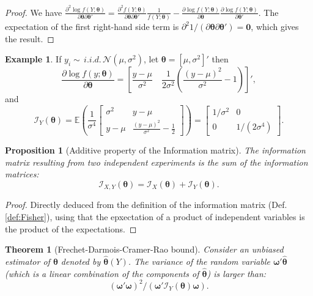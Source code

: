 \documentclass[
  12pt,
]{book}
\newtheorem{theorem}{Theorem}[chapter]
\newtheorem{proposition}{Proposition}[chapter]
\theoremstyle{definition}
\theoremstyle{definition}
\newtheorem{example}{Example}[chapter]
\theoremstyle{definition}
\theoremstyle{definition}
\theoremstyle{remark}
\begin{document}
\begin{proof}
We have \(\frac{\partial^2 \log f(Y;\boldsymbol\theta)}{\partial \boldsymbol\theta \partial \boldsymbol\theta'} = \frac{\partial^2 f(Y;\boldsymbol\theta)}{\partial \boldsymbol\theta \partial \boldsymbol\theta'}\frac{1}{f(Y;\boldsymbol\theta)} - \frac{\partial \log f(Y;\boldsymbol\theta)}{\partial \boldsymbol\theta}\frac{\partial \log f(Y;\boldsymbol\theta)}{\partial \boldsymbol\theta'}\). The expectation of the first right-hand side term is \(\partial^2 1 /(\partial \boldsymbol\theta \partial \boldsymbol\theta') = \mathbf{0}\), which gives the result.
\end{proof}

\begin{example}
If \(y_i \sim\,i.i.d.\, \mathcal{N}(\mu,\sigma^2)\), let \(\boldsymbol\theta = [\mu,\sigma^2]'\) then
\[
\frac{\partial \log f(y;\boldsymbol\theta)}{\partial \boldsymbol\theta} = \left[\frac{y-\mu}{\sigma^2} \quad \frac{1}{2\sigma^2}\left(\frac{(y-\mu)^2}{\sigma^2}-1\right) \right]',
\]
and
\[
\mathcal{I}_Y(\boldsymbol\theta) = \mathbb{E}\left( \frac{1}{\sigma^4}
\left[
\begin{array}{cc}
\sigma^2&y-\mu\\
y-\mu & \frac{(y-\mu)^2}{\sigma^2}-\frac{1}{2}
\end{array}\right]
\right)=
\left[
\begin{array}{cc}
1/\sigma^2&0\\
0 & 1/(2\sigma^4)
\end{array}\right].
\]
\end{example}

\begin{proposition}[Additive property of the Information matrix]
\protect\hypertarget{prp:additiv}{}\label{prp:additiv}The information matrix resulting from two independent experiments is the sum of the information matrices:
\[
\mathcal{I}_{X,Y}(\boldsymbol\theta) = \mathcal{I}_X(\boldsymbol\theta) + \mathcal{I}_Y(\boldsymbol\theta).
\]
\end{proposition}

\begin{proof}
Directly deduced from the definition of the information matrix (Def. \ref{def:Fisher}), using that the epxectation of a product of independent variables is the product of the expectations.
\end{proof}

\begin{theorem}[Frechet-Darmois-Cramer-Rao bound]
\protect\hypertarget{thm:FDCR}{}\label{thm:FDCR}Consider an unbiased estimator of \(\boldsymbol\theta\) denoted by \(\hat{\boldsymbol\theta}(Y)\). The variance of the random variable \(\boldsymbol\omega'\hat{\boldsymbol\theta}\) (which is a linear combination of the components of \(\hat{\boldsymbol\theta}\)) is larger than:
\[
(\boldsymbol\omega'\boldsymbol\omega)^2/(\boldsymbol\omega' \mathcal{I}_Y(\boldsymbol\theta) \boldsymbol\omega).
\]
\end{theorem}
\end{document}
